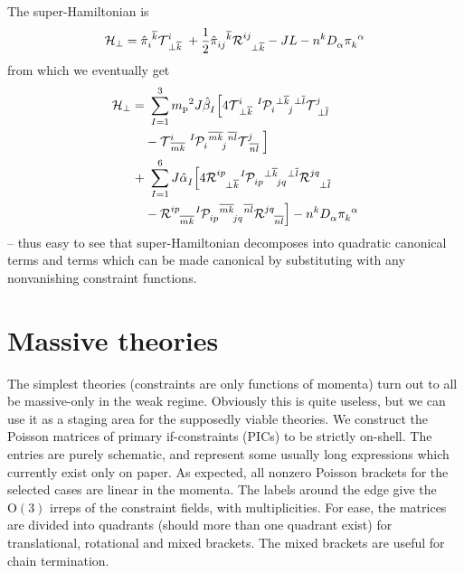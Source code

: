 \documentclass[aps,prd,reprint,preprintnumbers,superscriptaddress,showpacs,floatfix]{revtex4-2}
\begin{document}
The super-Hamiltonian is
\begin{equation}
  \mathcal{  H}_{\perp}=\tensor{\hat{\pi}}{_i^{\overline{k}}}\tensor{\mathcal{  T}}{^i_{\perp\overline{k}}}+\frac{1}{2}\tensor{\hat{\pi}}{_{ij}^{\overline{k}}}\tensor{\mathcal{  R}}{^{ij}_{\perp\overline{k}}}-JL-\tensor{n}{^k}\tensor{D}{_\alpha}\tensor{\pi}{_k^\alpha}
  \label{<+label+>}
\end{equation}
from which we eventually get
\begin{equation}
\begin{aligned}
  \mathcal{  H}_{\perp}=&\ \sum_{I=1}^{3}{m_\text{p}}^2J\tensor{\hat{\beta}}{_{I}}\Big[4\tensor{\mathcal{  T}}{^i_{\perp\overline{k}}}\tensor[^I]{\mathcal{  P}}{_i^{\perp\overline{k}}_j^{\perp\overline{l}}}\tensor{\mathcal{  T}}{^j_{\perp\overline{l}}}\\
  &-\tensor{\mathcal{  T}}{^i_{\overline{mk}}}\tensor[^I]{\mathcal{  P}}{_i^{\overline{mk}}_j^{\overline{nl}}}\tensor{\mathcal{  T}}{^j_{\overline{nl}}}\Big]\\
  +&\ \sum_{I=1}^{6}J\tensor{\hat{\alpha}}{_{I}}\Big[4\tensor{\mathcal{  R}}{^{ip}_{\perp\overline{k}}}\tensor[^I]{\mathcal{  P}}{_{ip}^{\perp\overline{k}}_{jq}^{\perp\overline{l}}}\tensor{\mathcal{  R}}{^{jq}_{\perp\overline{l}}}\\
  &-\tensor{\mathcal{  R}}{^{ip}_{\overline{mk}}}\tensor[^I]{\mathcal{  P}}{_{ip}^{\overline{mk}}_{jq}^{\overline{nl}}}\tensor{\mathcal{  R}}{^{jq}_{\overline{nl}}}\Big]-\tensor{n}{^k}\tensor{D}{_\alpha}\tensor{\pi}{_k^\alpha}\\
  \label{<+label+>}
\end{aligned}
\end{equation}
-- thus easy to see that super-Hamiltonian decomposes into quadratic canonical terms and terms which can be made canonical by substituting with any nonvanishing constraint functions.











\section{Massive theories}

The simplest theories (constraints are only functions of momenta) turn out to all be massive-only in the weak regime. Obviously this is quite useless, but we can use it as a staging area for the supposedly viable theories. We construct the Poisson matrices of primary if-constraints (PICs) to be strictly on-shell. The entries are purely schematic, and represent some usually long expressions which currently exist only on paper. As expected, all nonzero Poisson brackets for the selected cases are linear in the momenta. The labels around the edge give the $\mathrm{O}(3)$ irreps of the constraint fields, with multiplicities. For ease, the matrices are divided into quadrants (should more than one quadrant exist) for translational, rotational and mixed brackets. The mixed brackets are useful for chain termination.
\end{document}
